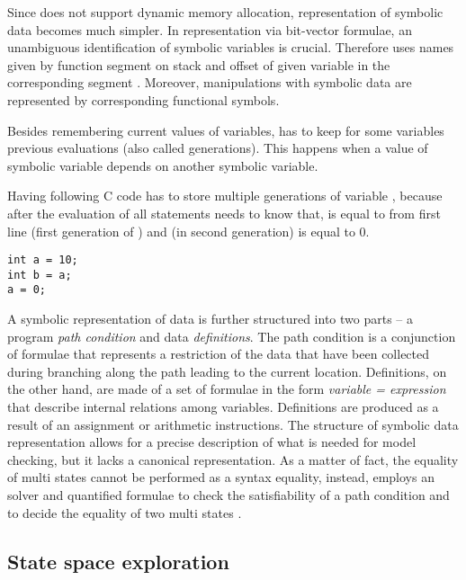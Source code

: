 Since \SymDIVINE does not support dynamic memory allocation, representation
of symbolic data becomes much simpler. In representation via bit-vector
\SMT formulae, an unambiguous identification of symbolic variables is crucial.
Therefore \SymDIVINE uses names given by function
segment on stack and offset of given variable in the corresponding segment \cite{Mrazek16}.
Moreover, manipulations with symbolic data are represented by corresponding functional symbols.

Besides remembering current values of variables, \SymDIVINE has to keep for
some variables previous evaluations (also called generations). This happens when
a value of symbolic variable depends on another symbolic variable.

\begin{example}\label{ex:gen}
Having following C code \SymDIVINE has to store multiple generations of variable
, because after the evaluation of all statements \SymDIVINE needs to know
that,  is equal to  from first line (first generation of
) and  (in second generation) is equal to $0$.

\begin{verbatim}
int a = 10;
int b = a;
a = 0;
\end{verbatim}

\end{example}

A symbolic representation of data is further structured into two parts -- a
program \emph{path condition} and data \emph{definitions}. The path condition is a
conjunction of formulae that represents a restriction of the data that have been
collected during branching along the path leading to the current location.
Definitions, on the other hand, are made of a set of formulae in the form
\emph{variable = expression} that describe internal relations among variables.
Definitions are produced as a result of an assignment or arithmetic
instructions. The structure of symbolic data representation allows for a
precise description of what is needed for model checking, but it lacks a
canonical representation. As a matter of fact, the equality of multi states
cannot be performed as a syntax equality, instead, \SymDIVINE employs an \SMT
solver and quantified formulae to check the satisfiability of a path condition
and to decide the equality of two multi states \cite{Mrazek16}.

\subsection{State space exploration}

